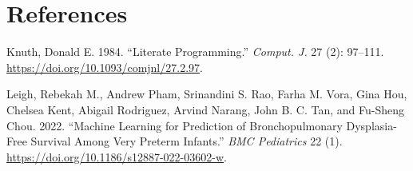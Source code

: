 \documentclass[
  letterpaper,
  DIV=11,
  numbers=noendperiod]{scrreprt}
\newlength{\cslhangindent}
\newlength{\cslentryspacingunit} %
\newenvironment{CSLReferences}[2] %
 {%
  \setlength{\parindent}{0pt}
  \ifodd #1
  \let\oldpar\par
  \def\par{\hangindent=\cslhangindent\oldpar}
  \fi
  \setlength{\parskip}{#2\cslentryspacingunit}
 }%
 {}
\begin{document}

\hypertarget{references}{%
\chapter*{References}\label{references}}


\hypertarget{refs}{}
\begin{CSLReferences}{1}{0}
\leavevmode{}%
Knuth, Donald E. 1984. {``Literate Programming.''} \emph{Comput. J.} 27
(2): 97--111. \url{https://doi.org/10.1093/comjnl/27.2.97}.

\leavevmode{}%
Leigh, Rebekah M., Andrew Pham, Srinandini S. Rao, Farha M. Vora, Gina
Hou, Chelsea Kent, Abigail Rodriguez, Arvind Narang, John B. C. Tan, and
Fu-Sheng Chou. 2022. {``Machine Learning for Prediction of
Bronchopulmonary Dysplasia-Free Survival Among Very Preterm Infants.''}
\emph{BMC Pediatrics} 22 (1).
\url{https://doi.org/10.1186/s12887-022-03602-w}.

\end{CSLReferences}
\end{document}
